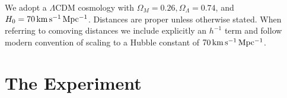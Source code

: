 \documentclass[iop]{emulateapj}
\begin{document}

We adopt a $\Lambda$CDM cosmology with $\Omega_M=0.26, \Omega_\Lambda=0.74$, and 
$H_0=70\,{\rm km\,s^{-1}\,Mpc^{-1}}$. Distances are proper unless otherwise stated. When referring 
to comoving distances we include explicitly an $h^{-1}$ term and follow modern convention of 
scaling to a Hubble constant of $70\,{\rm km\,s^{-1}\,Mpc^{-1}}$. 

\section{The Experiment}
\label{sec:experiment}
\end{document}
